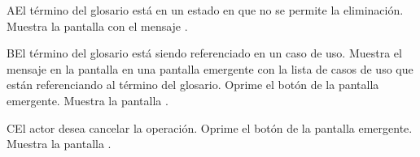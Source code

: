 	
	\begin{UCtrayectoriaA}{A}{El término del glosario está en un estado en que no se permite la eliminación.}
		\UCpaso[\UCsist] Muestra la pantalla  con el mensaje .
	\end{UCtrayectoriaA}

	\begin{UCtrayectoriaA}{B}{El término del glosario está siendo referenciado en un caso de uso.}
		\UCpaso[\UCsist] Muestra el mensaje  en la pantalla  en una pantalla emergente con la lista de casos de uso que están referenciando al término del glosario.
		\UCpaso[\UCactor] Oprime el botón  de la pantalla emergente.
		\UCpaso[\UCsist] Muestra la pantalla .
	\end{UCtrayectoriaA}

	\begin{UCtrayectoriaA}{C}{El actor desea cancelar la operación.}
		\UCpaso[\UCactor] Oprime el botón  de la pantalla emergente.
		\UCpaso[\UCsist] Muestra la pantalla .
	\end{UCtrayectoriaA}
	

